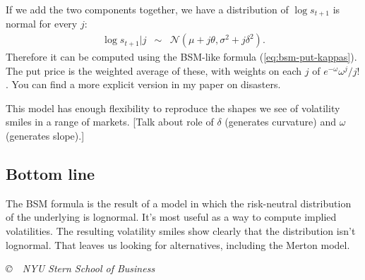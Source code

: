 \documentclass[11pt]{article}
\begin{document}
If we add the two components together, we have a distribution
of $\log s_{t+1}$ is normal for every $j$:
\begin{eqnarray*}
    \log s_{t+1} | j &\sim& \mathcal{N}(\mu + j \theta, \sigma^2 + j \delta^2).
\end{eqnarray*}
Therefore it can be computed using the BSM-like formula (\ref{eq:bsm-put-kappas}).
The put price is the weighted average of these, with weights
on each $j$ of $e^{-\omega} \omega^j / j!$.
You can find a more explicit version in my paper on disasters.

This model has enough flexibility to reproduce the shapes
we see of volatility smiles in a range of markets.
[Talk about role of $\delta$ (generates curvature)
and $\omega$ (generates slope).]


\subsection*{Bottom line}

The BSM formula is the result of a model in which the risk-neutral distribution
 of the underlying is lognormal.
 It's most useful as a way to compute implied volatilities.
 The resulting volatility smiles show clearly that the distribution
 isn't lognormal.
That leaves us looking for alternatives,  including the Merton model.

\vfill \centerline{\it \copyright \ \number\year \
NYU Stern School of Business}
\end{document}
